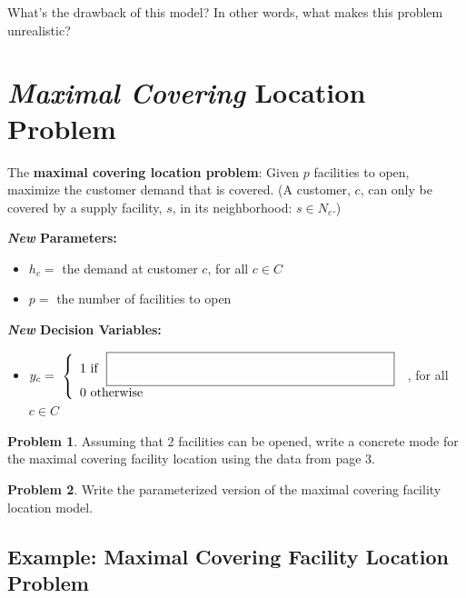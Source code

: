 \documentclass[11pt]{article}
\theoremstyle{definition}
\newtheorem{problem}{Problem}
\newcommand{\answerbox}[3]{%
  \fbox{%
    \begin{minipage}[#1]{#2}
      \hfill\vspace{#3}
    \end{minipage}
  }
}
\begin{document}
\vfill

What's the drawback of this model? In other words, what makes this problem unrealistic? \vspace{1in}



\newpage
\section{\emph{Maximal Covering} Location Problem}
The \textbf{maximal covering location problem}: Given $p$ facilities to open, maximize the customer demand that is covered.  (A customer, $c$, can only be covered by a supply facility, $s$, in its neighborhood: $s \in N_c$.)

\begin{center}
\end{center}

\textbf{
\emph{New} Parameters: }
\begin{itemize}
\item[] $h_c = $ the demand at customer $c$, for all $c \in C$
\item[]  $p = $ the number of facilities to open
\end{itemize}
\textbf{\emph{New} Decision Variables: }
\begin{itemize}
\item[] \def\arraystretch{1.8} $y_c = ~\left\{ \begin{array}{ll} 1 \text{ if }~\answerbox{c}{3in}{.7cm} \\ 0 \text{ otherwise } \end{array} \right. $
, for all $c \in C$
\end{itemize}

\begin{problem}
Assuming that 2 facilities can be opened, write a concrete mode for the maximal covering facility location using the data from page 3.
\end{problem}

\newpage

\begin{problem}
Write the parameterized version of the maximal covering facility location model.
\end{problem}


\newpage
\subsection{Example:  Maximal Covering Facility Location Problem}
\end{document}
